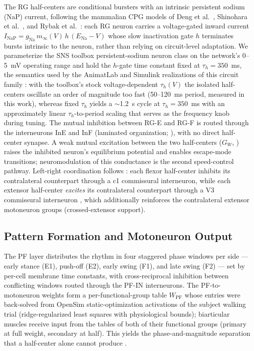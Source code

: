 The RG half-centers are conditional bursters with an intrinsic
persistent sodium (NaP) current, following the mammalian CPG models of
Deng et al.~\citep{deng2022}, Shinohara et al.~\citep{shinohara2025},
and Rybak et al.~\citep{rybak2024}: each RG neuron carries a
voltage-gated inward current
$I_{\mathrm{NaP}} = g_{\mathrm{Na}}\,m_\infty(V)\,h\,(E_{\mathrm{Na}}-V)$
whose slow inactivation gate $h$ terminates bursts intrinsic to the
neuron, rather than relying on circuit-level adaptation. We
parameterize the SNS toolbox persistent-sodium neuron class
\citep{nourse2023} on the network's 0--5~mV operating range and hold
the $h$-gate time constant fixed at $\tau_h = 350$~ms, the semantics
used by the AnimatLab and Simulink realizations of this circuit
family \citep{deng2022}: with the toolbox's stock voltage-dependent
$\tau_h(V)$ the isolated half-centers oscillate an order of magnitude
too fast (50--120~ms period, measured in this work), whereas fixed
$\tau_h$ yields a $\sim$1.2~s cycle at $\tau_h = 350$~ms with an
approximately linear $\tau_h$-to-period scaling that serves as the
frequency knob during tuning. The mutual inhibition between RG-E and
RG-F is routed through the interneurons InE and InF (laminated
organization; \citealp{shevtsova2026}), with no direct half-center
synapse. A weak mutual excitation between the two half-centers
($G_W$, \citealp{deng2022}) raises the inhibited neuron's equilibrium
potential and enables escape-mode transitions; neuromodulation of this
conductance is the second speed-control pathway. Left-right
coordination follows \citet{shinohara2025}: each flexor half-center
inhibits its contralateral counterpart through a c1 commissural
interneuron, while each extensor half-center \emph{excites} its
contralateral counterpart through a V3 commissural interneuron
\citep{talpalar2013, zhang2022}, which additionally reinforces the
contralateral extensor motoneuron groups (crossed-extensor support).

\subsection{Pattern Formation and Motoneuron Output}
\label{sec:spinal-cpg-pf}

The PF layer distributes the rhythm in four staggered phase windows per
side — early stance (E1), push-off (E2), early swing (F1), and late
swing (F2) — set by per-cell membrane time constants, with
cross-reciprocal inhibition between conflicting windows routed through
the PF-IN interneurons. The PF-to-motoneuron weights form a
per-functional-group table $W_{\mathrm{PF}}$ whose entries were
back-solved from OpenSim static-optimization activations of the
subject walking trial (ridge-regularized least squares with
physiological bounds); biarticular muscles receive input from the
tables of both of their functional groups (primary at full weight,
secondary at half). This yields the phase-and-magnitude separation that
a half-center alone cannot produce \citep{rybak2006, mccrea2008}.

